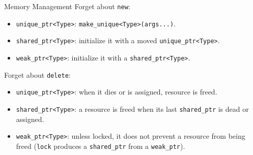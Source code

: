 \documentclass[presentation]{beamer}
\begin{document}
\begin{frame}[label={sec:org1ee7cda},fragile]{Memory Management}
 Forget about \texttt{new}:
\begin{itemize}
\item \texttt{unique\_ptr<Type>}: \texttt{make\_unique<Type>(args...)}.
\item \texttt{shared\_ptr<Type>}: initialize it with a moved \texttt{unique\_ptr<Type>}.
\item \texttt{weak\_ptr<Type>}: initialize it with a \texttt{shared\_ptr<Type>}.
\end{itemize}
Forget about \texttt{delete}:
\begin{itemize}
\item \texttt{unique\_ptr<Type>}: when it dies or is assigned, resource is
freed.
\item \texttt{shared\_ptr<Type>}: a resource is freed when its last \texttt{shared\_ptr}
is dead or assigned.
\item \texttt{weak\_ptr<Type>}: unless locked, it does not prevent a resource
from being freed (\texttt{lock} produces a \texttt{shared\_ptr} from a \texttt{weak\_ptr}).
\end{itemize}
\end{frame}
\end{document}
